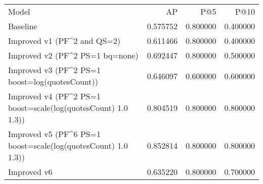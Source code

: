 \begin{tabular}{lrrr}
Model & AP & P@5 & P@10 \\
Baseline & 0.575752 & 0.800000 & 0.400000 \\
Improved v1 (PF^2 and QS=2) & 0.611466 & 0.800000 & 0.400000 \\
Improved v2 (PF^2 PS=1 bq=none) & 0.692447 & 0.800000 & 0.500000 \\
Improved v3 (PF^2 PS=1 boost=log(quotesCount)) & 0.646097 & 0.600000 & 0.600000 \\
Improved v4 (PF^2 PS=1 boost=scale(log(quotesCount) 1.0 1.3)) & 0.804519 & 0.800000 & 0.800000 \\
Improved v5 (PF^6 PS=1 boost=scale(log(quotesCount) 1.0 1.3)) & 0.852814 & 0.800000 & 0.800000 \\
Improved v6 & 0.635220 & 0.800000 & 0.700000 \\
\end{tabular}
